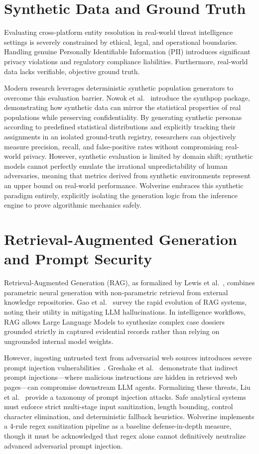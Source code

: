 \section{Synthetic Data and Ground Truth}
\label{sec:related-synthetic-data}
Evaluating cross-platform entity resolution in real-world threat intelligence settings is severely constrained by ethical, legal, and operational boundaries. Handling genuine Personally Identifiable Information (PII) introduces significant privacy violations and regulatory compliance liabilities. Furthermore, real-world data lacks verifiable, objective ground truth.

Modern research leverages deterministic synthetic population generators to overcome this evaluation barrier. Nowok et al.~\cite{nowok2016synthpop} introduce the synthpop package, demonstrating how synthetic data can mirror the statistical properties of real populations while preserving confidentiality. By generating synthetic personas according to predefined statistical distributions and explicitly tracking their assignments in an isolated ground-truth registry, researchers can objectively measure precision, recall, and false-positive rates without compromising real-world privacy. However, synthetic evaluation is limited by domain shift; synthetic models cannot perfectly emulate the irrational unpredictability of human adversaries, meaning that metrics derived from synthetic environments represent an upper bound on real-world performance. Wolverine embraces this synthetic paradigm entirely, explicitly isolating the generation logic from the inference engine to prove algorithmic mechanics safely.

\section{Retrieval-Augmented Generation and Prompt Security}
\label{sec:related-rag-safety}
Retrieval-Augmented Generation (RAG), as formalized by Lewis et al.~\cite{lewis2020retrieval}, combines parametric neural generation with non-parametric retrieval from external knowledge repositories. Gao et al.~\cite{gao2024retrieval} survey the rapid evolution of RAG systems, noting their utility in mitigating LLM hallucinations. In intelligence workflows, RAG allows Large Language Models to synthesize complex case dossiers grounded strictly in captured evidential records rather than relying on ungrounded internal model weights.

However, ingesting untrusted text from adversarial web sources introduces severe prompt injection vulnerabilities~\cite{perez2022ignore}. Greshake et al.~\cite{greshake2023not} demonstrate that indirect prompt injections—where malicious instructions are hidden in retrieved web pages—can compromise downstream LLM agents. Formalizing these threats, Liu et al.~\cite{liu2024formalizing} provide a taxonomy of prompt injection attacks. Safe analytical systems must enforce strict multi-stage input sanitization, length bounding, control character elimination, and deterministic fallback heuristics. Wolverine implements a 4-rule regex sanitization pipeline as a baseline defense-in-depth measure, though it must be acknowledged that regex alone cannot definitively neutralize advanced adversarial prompt injection.

